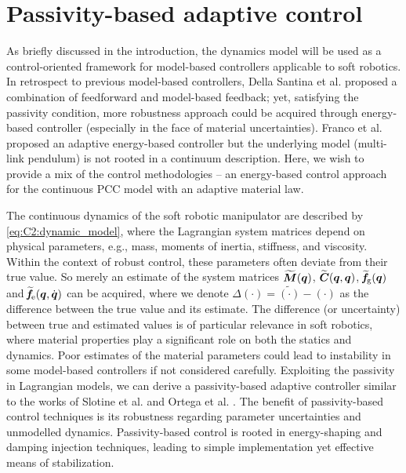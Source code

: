 \section{Passivity-based adaptive control}
\noindent As briefly discussed in the introduction, the dynamics model will be used as a control-oriented framework for model-based controllers applicable to soft robotics. In retrospect to previous model-based controllers, Della Santina et al.  \cite{DellaSantina2020} proposed a combination of feedforward and model-based feedback; yet, satisfying the passivity condition, more robustness approach could be acquired through energy-based controller (especially in the face of material uncertainties). Franco et al. \cite{Franco2020} proposed an adaptive energy-based controller but the underlying model (multi-link pendulum) is not rooted in a continuum description. Here, we wish to provide a mix of the control methodologies -- an energy-based control approach for the continuous PCC model with an adaptive material law.

The continuous dynamics of the soft robotic manipulator are described by \eqref{eq:C2:dynamic_model}, where the Lagrangian system matrices depend on physical parameters, e.g., mass, moments of inertia, stiffness, and viscosity. Within the context of robust control, these parameters often deviate from their true value. So merely an estimate of the system matrices $\widetilde{\boldsymbol{M}}({\boldsymbol{q}})$, $\widetilde{\boldsymbol{C}}({\boldsymbol{q}},{\boldsymbol{q}})$, $\widetilde{\!\boldsymbol{f}}\!_{\scriptstyle\textrm{g}}({\boldsymbol{q}})$ and $\widetilde{\!\boldsymbol{f}}\!_{\scriptstyle\textrm{e}}({\boldsymbol{q}},{\dot{\boldsymbol{q}}})$ can be acquired, where we denote $
\Delta (\cdot) = \tilde{(\cdot)} - (\cdot)$ as the difference between the true value and its estimate. The difference (or uncertainty) between true and estimated values is of particular relevance in soft robotics, where material properties play a significant role on both the statics and dynamics. Poor estimates of the material parameters could lead to instability in some model-based controllers if not considered carefully. Exploiting the passivity in Lagrangian models, we can derive a passivity-based adaptive controller similar to the works of Slotine et al. \cite{Slotine1988} and Ortega et al. \cite{Ortega1998}. The benefit of passivity-based control techniques is its robustness regarding parameter uncertainties and unmodelled dynamics. Passivity-based control is rooted in energy-shaping and damping injection techniques, leading to simple implementation yet effective means of stabilization.
%

